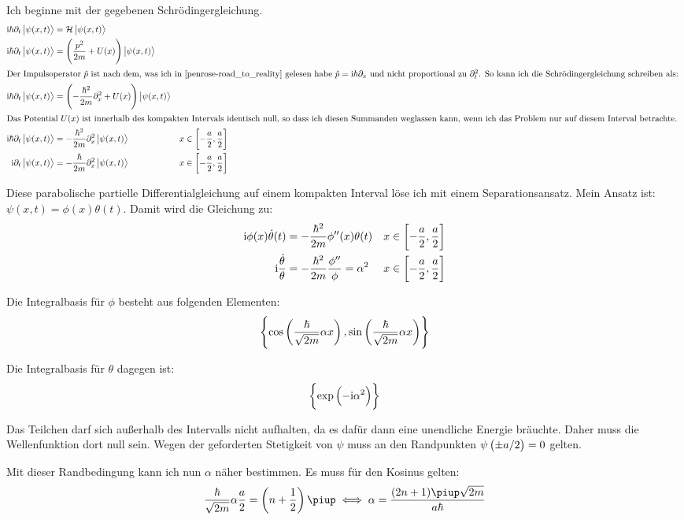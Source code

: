 Ich beginne mit der gegebenen Schrödingergleichung.
\begin{align*}
	\ii \hbar \partial_t \ket{\psi(x, t)} &= \hamilton \ket{\psi(x, t)} \\
	\ii \hbar \partial_t \ket{\psi(x, t)} &= \del{\frac{p^2}{2m} + U(x)} \ket{\psi(x, t)} \\
	\intertext{%
		Der Impulsoperator $\hat p$ ist nach dem, was ich in \cite[Seite
		496]{penrose-road_to_reality} gelesen habe $\hat p = \ii \hbar
		\partial_x$ und nicht proportional zu $\partial_t^2$. So kann ich die
		Schrödingergleichung schreiben als:
	}
	\ii \hbar \partial_t \ket{\psi(x, t)} &= \del{- \frac{\hbar^2}{2m} \partial_x^2 + U(x)} \ket{\psi(x, t)} \\
	\intertext{%
		Das Potential $U(x)$ ist innerhalb des kompakten Intervals identisch
		null, so dass ich diesen Summanden weglassen kann, wenn ich das Problem
		nur auf diesem Interval betrachte.
	}
	\ii \hbar \partial_t \ket{\psi(x, t)} &= -\frac{\hbar^2 }{2m} \partial_x^2 \ket{\psi(x, t)} &x \in \intcc{-\frac a2, \frac a2} \\
	\ii \partial_t \ket{\psi(x, t)} &= -\frac\hbar{2m} \partial_x^2 \ket{\psi(x, t)} &x \in \intcc{-\frac a2, \frac a2}
\end{align*}

Diese parabolische partielle Differentialgleichung auf einem kompakten Interval
löse ich mit einem Separationsansatz. Mein Ansatz ist: $\psi(x, t) = \phi(x)
\theta(t)$. Damit wird die Gleichung zu:
\begin{align*}
	\ii \phi(x) \dot \theta(t) &= -\frac{\hbar^2}{2m} \phi''(x) \theta(t) &x \in \intcc{-\frac a2, \frac a2} \\
	\ii \frac{\dot \theta}\theta &= -\frac{\hbar^2}{2m} \frac{\phi''}\phi = \alpha^2 &x \in \intcc{-\frac a2, \frac a2}
\end{align*}

Die Integralbasis für $\phi$ besteht aus folgenden Elementen:
\[
	\set{
		\cos\del{\frac\hbar{\sqrt{2m}}\alpha x},
		\sin\del{\frac\hbar{\sqrt{2m}}\alpha x}
	}
\]

Die Integralbasis für $\theta$ dagegen ist:
\[
	\set{
		\exp\del{
			- \ii \alpha^2
		}
	}
\]

Das Teilchen darf sich außerhalb des Intervalls nicht aufhalten, da es dafür
dann eine unendliche Energie bräuchte. Daher muss die Wellenfunktion dort null
sein. Wegen der geforderten Stetigkeit von $\psi$ muss an den Randpunkten
$\psi\del{\pm a/2} = 0$ gelten.

Mit dieser Randbedingung kann ich nun $\alpha$ näher bestimmen. Es muss für den
Kosinus gelten:
\[
	\frac\hbar{\sqrt{2m}}\alpha \frac a2 = \del{n + \half} \piup
	\iff
	\alpha = \frac{(2n+1)\piup \sqrt{2m}}{a\hbar}
\]


